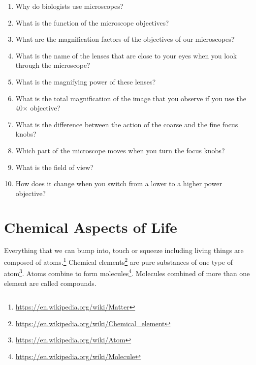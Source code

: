 \documentclass[]{book}
\providecommand{\tightlist}{%
  \setlength{\itemsep}{0pt}\setlength{\parskip}{0pt}}
\let\rmarkdownfootnote\footnote%
\def\footnote{\protect\rmarkdownfootnote}
\renewcommand{\href}[2]{#2\footnote{\url{#1}}}
\theoremstyle{definition}
\theoremstyle{definition}
\theoremstyle{definition}
\theoremstyle{remark}
\begin{document}
\begin{enumerate}
\def\labelenumi{\arabic{enumi}.}
\tightlist
\item
  Why do biologists use microscopes?
\item
  What is the function of the microscope objectives?
\item
  What are the magnification factors of the objectives of our
  microscopes?
\item
  What is the name of the lenses that are close to your eyes when you
  look through the microscope?
\item
  What is the magnifying power of these lenses?
\item
  What is the total magnification of the image that you observe if you
  use the 40× objective?
\item
  What is the difference between the action of the coarse and the fine
  focus knobs?
\item
  Which part of the microscope moves when you turn the focus knobs?
\item
  What is the field of view?
\item
  How does it change when you switch from a lower to a higher power
  objective?
\end{enumerate}

\chapter{Chemical Aspects of Life}\label{chemical-aspects-of-life}

\href{https://en.wikipedia.org/wiki/Matter}{Everything that we can bump
into, touch or squeeze including living things are composed of atoms.}
\href{https://en.wikipedia.org/wiki/Chemical_element}{Chemical elements}
are pure substances of one type of
\href{https://en.wikipedia.org/wiki/Atom}{atom}. Atoms combine to form
\href{https://en.wikipedia.org/wiki/Molecule}{molecules}. Molecules
combined of more than one element are called compounds.
\end{document}
